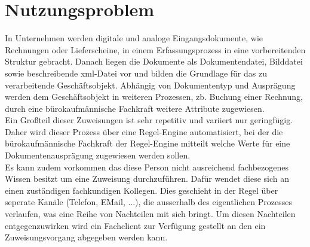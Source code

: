 \chapter{Nutzungsproblem}

In Unternehmen werden digitale und analoge Eingangsdokumente, wie Rechnungen oder Lieferscheine, 
in einem Erfassungsprozess in eine vorbereitenden Struktur gebracht. Danach liegen die Dokumente als Dokumentendatei, Bilddatei sowie beschreibende xml-Datei vor und bilden die Grundlage für das zu verarbeitende Geschäftsobjekt. Abhängig von Dokumententyp und Ausprägung werden dem Geschäftsobjekt in weiteren Prozessen, zb. Buchung einer Rechnung, durch eine bürokaufmännische Fachkraft weitere Attribute zugewiesen.\\
Ein Großteil dieser Zuweisungen ist sehr repetitiv und variiert nur geringfügig. Daher wird dieser Prozess über eine Regel-Engine automatisiert, bei der die bürokaufmännische Fachkraft der Regel-Engine mitteilt welche Werte für eine Dokumentenausprägung zugewiesen werden sollen.\\
Es kann zudem vorkommen das diese Person nicht ausreichend fachbezogenes Wissen besitzt um eine Zuweisung durchzuführen. Dafür wendet diese sich an einen zuständigen fachkundigen Kollegen. Dies geschieht in der Regel über seperate Kanäle (Telefon, EMail, ...), die ausserhalb des eigentlichen Prozesses verlaufen, was eine Reihe von Nachteilen mit sich bringt. Um diesen Nachteilen entgegenzuwirken wird ein Fachclient zur Verfügung gestellt an den ein Zuweisungsvorgang abgegeben werden kann.